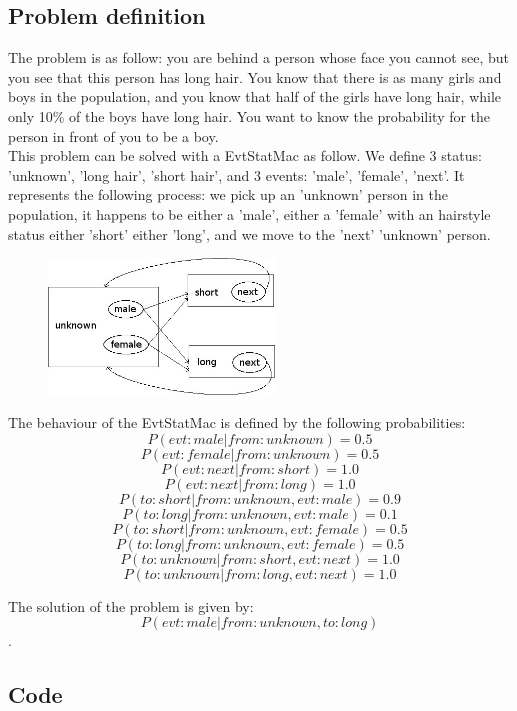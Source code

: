 \documentclass[12pt, a4paper]{article}
\begin{document}
\subsection{Problem definition}

The problem is as follow: you are behind a person whose face you cannot see, but you see that this person has long hair. You know that there is as many girls and boys in the population, and you know that half of the girls have long hair, while only 10\% of the boys have long hair. You want to know the probability for the person in front of you to be a boy.\\

This problem can be solved with a EvtStatMac as follow. We define 3 status: 'unknown', 'long hair', 'short hair', and 3 events: 'male', 'female', 'next'. It represents the following process: we pick up an 'unknown' person in the population, it happens to be either a 'male', either a 'female' with an hairstyle status either 'short' either 'long', and we move to the 'next' 'unknown' person.\\

\begin{center}
\begin{figure}[H]
\centering
\includegraphics[width=6cm]{./ex1.jpg}
\end{figure}
\end{center}

The behaviour of the EvtStatMac is defined by the following probabilities:\\
$$P(evt:male|from:unknown)=0.5$$
$$P(evt:female|from:unknown)=0.5$$
$$P(evt:next|from:short)=1.0$$
$$P(evt:next|from:long)=1.0$$
$$P(to:short|from:unknown,evt:male)=0.9$$
$$P(to:long|from:unknown,evt:male)=0.1$$
$$P(to:short|from:unknown,evt:female)=0.5$$
$$P(to:long|from:unknown,evt:female)=0.5$$
$$P(to:unknown|from:short,evt:next)=1.0$$
$$P(to:unknown|from:long,evt:next)=1.0$$

The solution of the problem is given by: $$P(evt:male|from:unknown,to:long)$$.\\

\subsection{Code}
\end{document}
